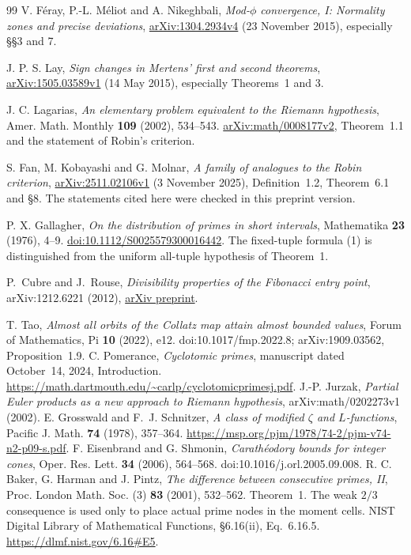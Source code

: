 \documentclass[11pt]{article}
\theoremstyle{definition}
\begin{document}
\begin{thebibliography}{99}
V. F\'eray, P.-L. M\'eliot and A. Nikeghbali,
\emph{Mod-$\phi$ convergence, I: Normality zones and precise deviations},
\href{https://arxiv.org/abs/1304.2934v4}{arXiv:1304.2934v4}
(23 November 2015), especially \S\S3 and 7.

J. P. S. Lay, \emph{Sign changes in Mertens' first and second theorems},
\href{https://arxiv.org/abs/1505.03589v1}{arXiv:1505.03589v1}
(14 May 2015), especially Theorems~1 and 3.

J. C. Lagarias, \emph{An elementary problem equivalent to the
Riemann hypothesis}, Amer. Math. Monthly \textbf{109} (2002), 534--543.
\href{https://arxiv.org/abs/math/0008177v2}{arXiv:math/0008177v2},
Theorem~1.1 and the statement of Robin's criterion.

S. Fan, M. Kobayashi and G. Molnar,
\emph{A family of analogues to the Robin criterion},
\href{https://arxiv.org/abs/2511.02106v1}{arXiv:2511.02106v1}
(3 November 2025), Definition~1.2, Theorem~6.1 and \S8.
The statements cited here were checked in this preprint version.

P. X. Gallagher, \emph{On the distribution of primes in short intervals},
Mathematika \textbf{23} (1976), 4--9.
\href{https://doi.org/10.1112/S0025579300016442}{doi:10.1112/S0025579300016442}.
The fixed-tuple formula (1) is distinguished from the uniform
all-tuple hypothesis of Theorem~1.

P.~Cubre and J.~Rouse,
\emph{Divisibility properties of the Fibonacci entry point},
arXiv:1212.6221 (2012),
\href{https://arxiv.org/abs/1212.6221}{arXiv preprint}.

T. Tao, \emph{Almost all orbits of the Collatz map attain almost
bounded values}, Forum of Mathematics, Pi \textbf{10} (2022), e12.
doi:10.1017/fmp.2022.8; arXiv:1909.03562, Proposition~1.9.
C. Pomerance, \emph{Cyclotomic primes}, manuscript dated
October~14, 2024, Introduction.
\url{https://math.dartmouth.edu/~carlp/cyclotomicprimesj.pdf}.
J.-P. Jurzak, \emph{Partial Euler products as a new approach to
Riemann hypothesis}, arXiv:math/0202273v1 (2002).
E. Grosswald and F.~J. Schnitzer, \emph{A class of modified
$\zeta$ and $L$-functions}, Pacific J. Math. \textbf{74} (1978),
357--364. \url{https://msp.org/pjm/1978/74-2/pjm-v74-n2-p09-s.pdf}.
F. Eisenbrand and G. Shmonin, \emph{Carath\'eodory bounds for
integer cones}, Oper. Res. Lett. \textbf{34} (2006), 564--568.
doi:10.1016/j.orl.2005.09.008.
R. C. Baker, G. Harman and J. Pintz,
\emph{The difference between consecutive primes, II},
Proc. London Math. Soc. (3) \textbf{83} (2001), 532--562.
Theorem~1. The weak $2/3$ consequence is used only to place
actual prime nodes in the moment cells.
NIST Digital Library of Mathematical Functions,
\S6.16(ii), Eq.~6.16.5.
\url{https://dlmf.nist.gov/6.16#E5}.


\end{thebibliography}
\end{document}
